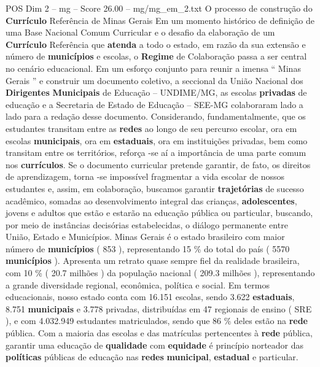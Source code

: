 \begin{textsample}{POS Dim 2 – mg – Score 26.00 – mg/mg\_em\_2.txt}  \label{ex:f2_pos_195}
O processo de construção do \textbf{Currículo} Referência de Minas Gerais Em um momento histórico de definição de uma Base Nacional Comum Curricular e o desafio da elaboração de um \textbf{Currículo} Referência que \textbf{atenda} a todo o estado, em razão da sua extensão e número de \textbf{municípios} e escolas, o \textbf{Regime} de Colaboração passa a ser central no cenário educacional.
Em um esforço conjunto para reunir a imensa “ Minas Gerais ” e construir um documento coletivo, a seccional da União Nacional dos \textbf{Dirigentes} \textbf{Municipais} de Educação – UNDIME/MG, as escolas \textbf{privadas} de educação e a Secretaria de Estado de Educação – SEE-MG colaboraram lado a lado para a redação desse documento.
Considerando, fundamentalmente, que os estudantes transitam entre as \textbf{redes} ao longo de seu percurso escolar, ora em escolas \textbf{municipais}, ora em \textbf{estaduais}, ora em instituições privadas, bem como transitam entre os territórios, reforça -se aí a importância de uma parte comum nos \textbf{currículos}.
Se o documento curricular pretende garantir, de fato, os direitos de aprendizagem, torna -se impossível fragmentar a vida escolar de nossos estudantes e, assim, em colaboração, buscamos garantir \textbf{trajetórias} de sucesso acadêmico, somadas ao desenvolvimento integral das crianças, \textbf{adolescentes}, jovens e adultos que estão e estarão na educação pública ou particular, buscando, por meio de instâncias decisórias estabelecidas, o diálogo permanente entre União, Estado e Municípios.
Minas Gerais é o estado brasileiro com maior número de \textbf{municípios} ( 853 ), representando 15 \% do total do país ( 5570 \textbf{municípios} ).
Apresenta um retrato quase sempre fiel da realidade brasileira, com 10 \% ( 20.7 milhões ) da população nacional ( 209.3 milhões ), representando a grande diversidade regional, econômica, política e social.
Em termos educacionais, nosso estado conta com 16.151 escolas, sendo 3.622 \textbf{estaduais}, 8.751 \textbf{municipais} e 3.778 privadas, distribuídas em 47 regionais de ensino ( SRE ), e com 4.032.949 estudantes matriculados, sendo que 86 \% deles estão na \textbf{rede} pública.
Com a maioria das escolas e das matrículas pertencentes à \textbf{rede} pública, garantir uma educação de \textbf{qualidade} com \textbf{equidade} é princípio norteador das \textbf{políticas} públicas de educação nas \textbf{redes} \textbf{municipal}, \textbf{estadual} e particular.

\end{textsample}
